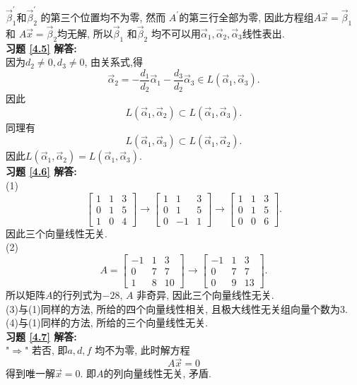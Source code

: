 \documentclass[a4paper]{book}
\begin{document}
$\vec{\beta}_1^{'}$和$\vec{\beta}_2^{'}$ 的第三个位置均不为零, 然而 $A^{'}$的第三行全部为零, 因此方程组$A\vec{x}=\vec{\beta}_1$ 和
$A\vec{x}=\vec{\beta}_2$均无解, 所以$\vec{\beta}_1$ 和$\vec{\beta}_2$ 均不可以用$\vec{\alpha}_1, \vec{\alpha}_2, \vec{\alpha}_3$线性表出.\\
\textbf{习题 \ref{4.5} 解答:}\\
因为$d_2\not=0, d_3\not =0$, 由关系式,得$$\vec{\alpha}_2=-\frac{d_1}{d_2}\vec{\alpha}_1-\frac{d_3}{d_2}\vec{\alpha}_3\in L(\vec{\alpha}_1,\vec{\alpha}_3).$$ 因此$$L(\vec{\alpha}_1,\vec{\alpha}_2)\subset L(\vec{\alpha}_1,\vec{\alpha}_3).$$
同理有$$L(\vec{\alpha}_1,\vec{\alpha}_3)\subset L(\vec{\alpha}_1,\vec{\alpha}_2).$$ 因此$L(\vec{\alpha}_1,\vec{\alpha}_2)=L(\vec{\alpha}_1,\vec{\alpha}_3)$.\\
\textbf{习题 \ref{4.6} 解答:}\\
(1)$$\begin{bmatrix}1&1&3\\0&1&5\\1&0&4\end{bmatrix}\longrightarrow \begin{bmatrix}1&1&3\\0&1&5\\0&-1&1\end{bmatrix} \longrightarrow \begin{bmatrix}1&1&3\\0&1&5\\0&0&6\end{bmatrix} .$$ 因此三个向量线性无关.\\
(2)$$A=\begin{bmatrix}-1&1&3\\0&7&7\\1&8&10\end{bmatrix}\longrightarrow \begin{bmatrix}-1&1&3\\0&7&7\\0&9&13\end{bmatrix}.$$ 所以矩阵$A$的行列式为$-28$, $A$ 非奇异, 因此三个向量线性无关.\\
(3)与(1)同样的方法, 所给的四个向量线性相关, 且极大线性无关组向量个数为3.\\
(4)与(1)同样的方法, 所给的三个向量线性无关.\\
\textbf{习题 \ref{4.7} 解答:}\\
"$\Rightarrow$" 若否, 即$a,d,f$ 均不为零, 此时解方程$$A\vec{x}=0$$ 得到唯一解$\vec{x}=0$. 即$A$的列向量线性无关, 矛盾.\\
\end{document}
